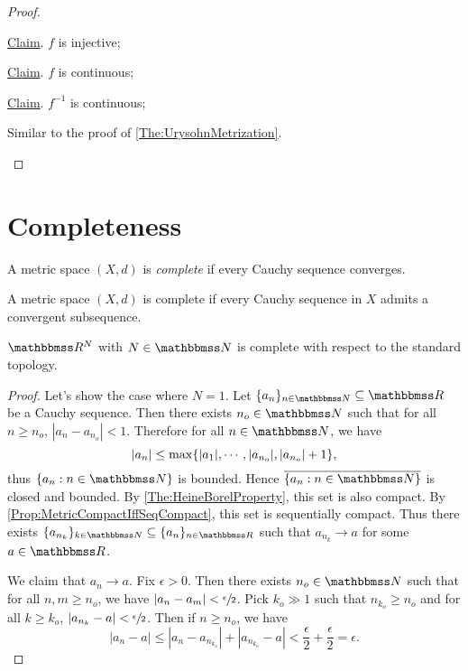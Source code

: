 \documentclass[screen,single]{techreport}
\numberwithin{equation}{section}
\begin{document}
\begin{proof}
\begin{itemize}
    \underline{Claim}. $f$ is injective;
    
    \underline{Claim}. $f$ is continuous;
  
    \underline{Claim}. $f^{-1}$ is continuous;
    
    Similar to the proof of \cref{The:UrysohnMetrization}.
  \end{itemize}
\end{proof}

\section{Completeness}

\begin{definition}\label{De:CompleteMetric}
  A metric space $(X,d)$ is \emph{complete} if every Cauchy sequence converges.
\end{definition}

\begin{proposition}\label{Prop:MetricCompleteIfCauchyHasConvSub}
  A metric space $(X,d)$ is complete if every Cauchy sequence in $X$ admits a convergent subsequence.
\end{proposition}

\begin{lemma}\label{Lem:RNComplete}
  $\bbR^N$ with $N \in \bbN$ is complete with respect to the standard topology.
\end{lemma}
\begin{proof}
  Let's show the case where $N = 1$.
  Let $\{a_n\}_{n \in \bbN} \subseteq \bbR$ be a Cauchy sequence.
  Then there exists $n_o \in \bbN$ such that for all $n \ge n_o$, $|a_n - a_{n_o}| < 1$.
  Therefore for all $n \in \bbN$, we have
  \[
  |a_n| \le \max\{ { |a_1|,\cdots,|a_{n_o}|,|a_{n_o}|+1 } \},
  \]
  thus $\{a_n : n \in \bbN\}$ is bounded.
  Hence $\overline{\{a_n : n \in \bbN \}}$ is closed and bounded.
  By \cref{The:HeineBorelProperty}, this set is also compact.
  By \cref{Prop:MetricCompactIffSeqCompact}, this set is sequentially compact.
  Thus there exists $\{a_{n_k}\}_{k \in \bbN} \subseteq \{a_n\}_{n \in \bbR}$ such that $a_{n_k} \rightarrow a$ for some $a \in \bbR$.
  
  We claim that $a_n \rightarrow a$.
  Fix $\epsilon > 0$.
  Then there exists $n_o \in \bbN$ such that for all $n,m \ge n_o$, we have $|a_n-a_m| < \sfrac{\epsilon}{2}$.
  Pick $k_o \gg 1$ such that $n_{k_o} \ge n_o$ and for all $k \ge k_o$, $|a_{n_k} - a| < \sfrac{\epsilon}{2}$.
  Then if $n \ge n_o$, we have
  \[
  |a_n - a| \le |a_n - a_{n_{k_o}}| + |a_{n_{k_o}} - a| < \frac{\epsilon}{2} + \frac{\epsilon}{2} = \epsilon.
  \]
\end{proof}
\end{document}

